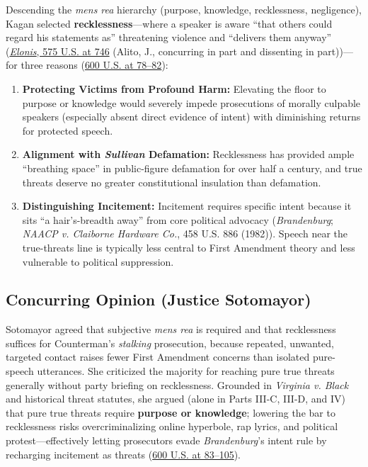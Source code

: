 \documentclass[12pt]{article}
\begin{document}
Descending the \textit{mens rea} hierarchy (purpose, knowledge, recklessness, negligence), Kagan selected \textbf{recklessness}---where a speaker is aware ``that others could regard his statements as'' threatening violence and ``delivers them anyway'' (\href{https://supreme.justia.com/cases/federal/us/575/723/}{\textit{Elonis}, 575 U.S. at 746} (Alito, J., concurring in part and dissenting in part))---for three reasons (\href{https://supreme.justia.com/cases/federal/us/600/22-138/}{600 U.S. at 78--82}):
\begin{enumerate}
  \item \textbf{Protecting Victims from Profound Harm:} Elevating the floor to purpose or knowledge would severely impede prosecutions of morally culpable speakers (especially absent direct evidence of intent) with diminishing returns for protected speech.
  \item \textbf{Alignment with \textit{Sullivan} Defamation:} Recklessness has provided ample ``breathing space'' in public-figure defamation for over half a century, and true threats deserve no greater constitutional insulation than defamation.
  \item \textbf{Distinguishing Incitement:} Incitement requires specific intent because it sits ``a hair's-breadth away'' from core political advocacy (\textit{Brandenburg}; \textit{NAACP v. Claiborne Hardware Co.}, 458 U.S. 886 (1982)). Speech near the true-threats line is typically less central to First Amendment theory and less vulnerable to political suppression.
\end{enumerate}

\subsection{Concurring Opinion (Justice Sotomayor)}

Sotomayor agreed that subjective \textit{mens rea} is required and that recklessness suffices for Counterman's \textit{stalking} prosecution, because repeated, unwanted, targeted contact raises fewer First Amendment concerns than isolated pure-speech utterances. She criticized the majority for reaching pure true threats generally without party briefing on recklessness. Grounded in \textit{Virginia v. Black} and historical threat statutes, she argued (alone in Parts III-C, III-D, and IV) that pure true threats require \textbf{purpose or knowledge}; lowering the bar to recklessness risks overcriminalizing online hyperbole, rap lyrics, and political protest---effectively letting prosecutors evade \textit{Brandenburg}'s intent rule by recharging incitement as threats (\href{https://supreme.justia.com/cases/federal/us/600/22-138/}{600 U.S. at 83--105}).
\end{document}
